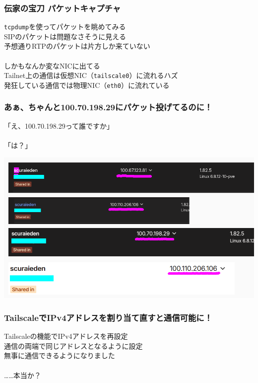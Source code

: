 \documentclass[
  lualatex,
  aspectratio=169,
  14pt
]{beamer}
\begin{document}
\begin{frame}
  \frametitle{伝家の宝刀 パケットキャプチャ}

  \texttt{tcpdump}を使ってパケットを眺めてみる\\
  \hspace{1.5\zw}SIPのパケットは問題なさそうに見える\\
  \hspace{1.5\zw}予想通りRTPのパケットは片方しか来ていない
  \\~\\[-.5\baselineskip]

  しかもなんか変なNICに出てる\\
  \hspace{1.5\zw}Tailnet上の通信は仮想NIC（\texttt{tailscale0}）に流れるハズ\\
  \hspace{1.5\zw}発狂している通信では物理NIC（\texttt{eth0}）に流れている

  \note{ }
\end{frame}

\begin{frame}
  \frametitle{あぁ、ちゃんと100.70.198.29にパケット投げてるのに！}

  「え、100.70.198.29って誰ですか」
  \\~\\[2\baselineskip]

  「は？」

  \note{ }
\end{frame}

\begin{frame}
  \centering
  \includegraphics[height=.9\textheight]{./images/hakkyo.png}
\end{frame}

\begin{frame}
  \frametitle{TailscaleでIPv4アドレスを割り当て直すと通信可能に！}

  Tailscaleの機能でIPv4アドレスを再設定\\
  \hspace{1.5\zw}通信の両端で同じアドレスとなるように設定\\
  \hspace{1.5\zw}無事に通信できるようになりました
  \\~\\[-.5\baselineskip]

  \hfill ……本当か？

  \note{ }
\end{frame}
\end{document}
